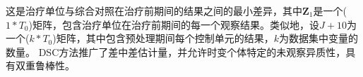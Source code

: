 这是治疗单位与综合对照在治疗前期间的结果之间的最小差异，其中$\mathbf{Z}_{1}$是一个($1*T_0$)矩阵，包含治疗单位在治疗前期间的每一个观察结果。类似地，设$J+1$0为一个($k * T_0$)矩阵，其中包含预处理期间每个控制单元的结果，$k$为数据集中变量的数量。
DSC方法推广了差中差估计量，并允许时变个体特定的未观察异质性，具有双重鲁棒性\cite{billmeier2013, smith2015}。





